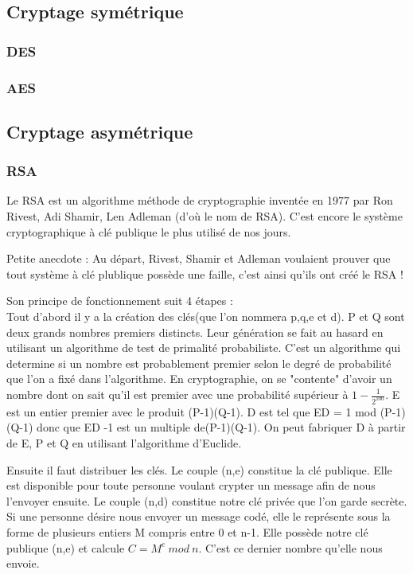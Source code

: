 \documentclass[a4paper,12pt]{article}
\begin{document}
			\subsection{Cryptage symétrique}
			\subsubsection{DES}
			\subsubsection{AES}

			\subsection{Cryptage asymétrique}
			\subsubsection{RSA}
 Le RSA est un algorithme méthode de cryptographie inventée en 1977 par  Ron Rivest, Adi Shamir, Len Adleman (d'où le nom de RSA). C'est encore le système cryptographique à clé publique le plus utilisé de nos jours.

Petite anecdote : Au départ, Rivest, Shamir et Adleman voulaient prouver que tout système à clé plublique possède une faille, c'est ainsi qu'ils ont créé le RSA !

 Son principe de fonctionnement suit 4 étapes : \\
 Tout d'abord il y a la création des clés(que l'on nommera p,q,e et d). P et Q sont deux grands nombres premiers distincts. Leur génération se fait au hasard en utilisant un algorithme de test de primalité probabiliste. C'est un algorithme qui determine si un nombre est probablement premier selon le degré de probabilité que l'on a fixé dans l'algorithme. En cryptographie, on se "contente" d'avoir un nombre dont on sait qu'il est premier avec une probabilité supérieur à \begin{math} 1- \frac{1}{2^{100}} \end{math}. E est un entier premier avec le produit (P-1)(Q-1). D est tel que ED = 1 mod (P-1)(Q-1) donc que ED -1 est un multiple de(P-1)(Q-1). On peut fabriquer D à partir de E, P et Q en utilisant l'algorithme d'Euclide.

Ensuite il faut distribuer les clés. Le couple (n,e) constitue la clé publique. Elle est disponible pour toute personne voulant crypter un message afin de nous l'envoyer ensuite. Le couple (n,d) constitue notre clé privée que l'on garde secrète. Si une personne désire nous envoyer un message codé, elle le représente sous la forme de plusieurs entiers M compris entre 0 et n-1. Elle possède notre clé publique (n,e) et calcule \begin{math}C = M^{e} \ mod\ n\end{math}. C'est ce dernier nombre qu'elle nous envoie.
\end{document}
